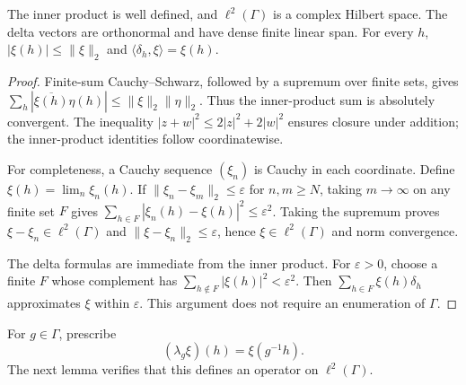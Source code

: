 \begin{proposition}\label{prop:l2-hilbert-basis}
\leanok
{}
The inner product is well defined, and $\ell^2(\Gamma)$ is a complex
Hilbert space. The delta vectors are orthonormal and have dense finite
linear span. For every $h$,
$|\xi(h)|\leq\|\xi\|_2$ and $\langle\delta_h,\xi\rangle=\xi(h)$.
\end{proposition}
\begin{proof}
\leanok
Finite-sum Cauchy--Schwarz, followed by a supremum over finite sets,
gives $\sum_h|\overline{\xi(h)}\eta(h)|\leq\|\xi\|_2\|\eta\|_2$.
Thus the inner-product sum is absolutely convergent.
The inequality $|z+w|^2\leq2|z|^2+2|w|^2$ ensures closure under addition;
the inner-product identities follow coordinatewise.

For completeness, a Cauchy sequence $(\xi_n)$ is Cauchy in each
coordinate. Define $\xi(h)=\lim_n\xi_n(h)$. If
$\|\xi_n-\xi_m\|_2\leq\varepsilon$ for $n,m\geq N$, taking $m\to\infty$
on any finite set $F$ gives
$\sum_{h\in F}|\xi_n(h)-\xi(h)|^2\leq\varepsilon^2$.
Taking the supremum proves $\xi-\xi_n\in\ell^2(\Gamma)$ and
$\|\xi-\xi_n\|_2\leq\varepsilon$, hence $\xi\in\ell^2(\Gamma)$ and norm
convergence.

The delta formulas are immediate from the inner product.
For $\varepsilon>0$, choose a finite $F$ whose complement has
$\sum_{h\notin F}|\xi(h)|^2<\varepsilon^2$.
Then $\sum_{h\in F}\xi(h)\delta_h$ approximates $\xi$ within $\varepsilon$.
This argument does not require an enumeration of $\Gamma$.
\end{proof}

\begin{definition}\label{def:left-translation}
\leanok
{}
For $g\in\Gamma$, prescribe
\[
 (\lambda_g\xi)(h)=\xi(g^{-1}h).
\]
The next lemma verifies that this defines an operator on $\ell^2(\Gamma)$.
\end{definition}

